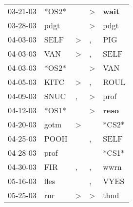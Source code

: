 \begin{supertabular}{p{0.07\textwidth}p{0.06\textwidth}p{0.02\textwidth}p{0.02\textwidth}p{0.06\textwidth}}
          03-21-03\textsuperscript{} &                            *OS2* &                  &     \textgreater &  \textbf{wait\textsuperscript{}} \\
          03-28-03\textsuperscript{} &           pdgt\textsuperscript{} &                  &     \textgreater &           pdgt\textsuperscript{} \\
          04-03-03\textsuperscript{} &           SELF\textsuperscript{} &     \textgreater &                , &            PIG\textsuperscript{} \\
          04-03-03\textsuperscript{} &            VAN\textsuperscript{} &     \textgreater &                , &           SELF\textsuperscript{} \\
          04-03-03\textsuperscript{} &                            *OS2* &                  &     \textgreater &            VAN\textsuperscript{} \\
          04-05-03\textsuperscript{} &           KITC\textsuperscript{} &     \textgreater &                , &           ROUL\textsuperscript{} \\
          04-09-03\textsuperscript{} &           SNUC\textsuperscript{} &                , &     \textgreater &           prof\textsuperscript{} \\
          04-12-03\textsuperscript{} &                            *OS1* &                  &     \textgreater &  \textbf{reso\textsuperscript{}} \\
          04-20-03\textsuperscript{} &           gotm\textsuperscript{} &     \textgreater &                  &                            *CS2* \\
          04-25-03\textsuperscript{} &           POOH\textsuperscript{} &                  &                , &           SELF\textsuperscript{} \\
          04-28-03\textsuperscript{} &           prof\textsuperscript{} &                  &                  &                            *CS1* \\
          04-30-03\textsuperscript{} &            FIR\textsuperscript{} &                , &                , &           wwrn\textsuperscript{} \\
          05-16-03\textsuperscript{} &           fles\textsuperscript{} &                  &                , &           VYES\textsuperscript{} \\
          05-25-03\textsuperscript{} &            rnr\textsuperscript{} &     \textgreater &     \textgreater &           thnd\textsuperscript{} \\

\end{supertabular}

